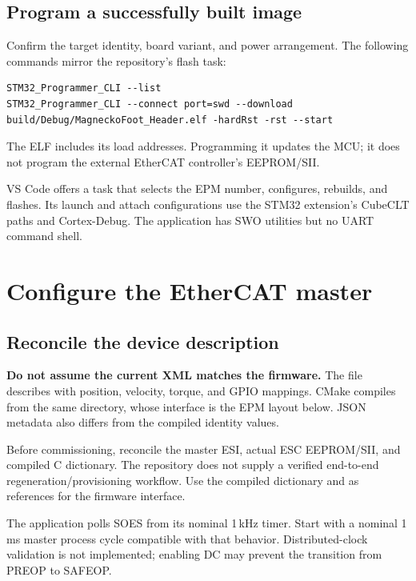 \documentclass[10pt,a4paper,oneside]{report}
\newcommand{\code}[1]{\texttt{\detokenize{#1}}}
\begin{document}
\section{Program a successfully built image}

Confirm the target identity, board variant, and power arrangement. The
following commands mirror the repository's flash task:

\begin{verbatim}
STM32_Programmer_CLI --list
STM32_Programmer_CLI --connect port=swd --download build/Debug/MagneckoFoot_Header.elf -hardRst -rst --start
\end{verbatim}

The ELF includes its load addresses. Programming it updates the MCU;
it does not program the external EtherCAT controller's EEPROM/SII.

VS Code offers a \code{Build + Flash} task that selects the EPM number,
configures, rebuilds, and flashes. Its launch and attach configurations
use the STM32 extension's CubeCLT paths and Cortex-Debug. The application
has SWO utilities but no UART command shell.

\chapter{Configure the EtherCAT master}
\label{sec:ethercat}

\section{Reconcile the device description}

\textbf{Do not assume the current XML matches the firmware.}
The file  describes
\code{Actuator V1} with position, velocity, torque, and GPIO mappings.
CMake compiles  from the same directory, whose
interface is the EPM layout below. JSON metadata also differs from the
compiled identity values.

Before commissioning, reconcile the master ESI, actual ESC EEPROM/SII,
and compiled C dictionary. The repository does not supply a verified
end-to-end regeneration/provisioning workflow. Use the compiled dictionary
and  as references for the firmware interface.

The application polls SOES from its nominal 1\,kHz timer. Start with
a nominal 1\,ms master process cycle compatible with that behavior.
Distributed-clock validation is not implemented; enabling DC may prevent
the transition from PREOP to SAFEOP.
\end{document}
